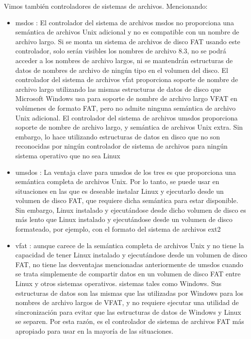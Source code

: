 \documentclass[11pt, a4paper]{report}
\begin{document}
Vimos también controladores de sistemas de archivos. Mencionando: \\

\begin{itemize}
\item msdos : El controlador del sistema de archivos msdos no proporciona una
  semántica de archivos Unix adicional y no es compatible con un nombre de
  archivo largo. Si se monta un sistema de archivos de disco FAT usando este
  controlador, solo serán visibles los nombres de archivo 8.3, no se podrá
  acceder a los nombres de archivo largos, ni se mantendrán estructuras de
  datos de nombres de archivo de ningún tipo en el volumen del disco. El
  controlador del sistema de archivos vfat proporciona soporte de nombre de
  archivo largo utilizando las mismas estructuras de datos de disco que
  Microsoft Windows usa para soporte de nombre de archivo largo VFAT en
  volúmenes de formato FAT, pero no admite ninguna semántica de archivo Unix
  adicional. El controlador del sistema de archivos umsdos proporciona soporte
  de nombre de archivo largo, y semántica de archivos Unix extra. Sin embargo,
  lo hace utilizando estructuras de datos en disco que no son reconocidas por
  ningún controlador de sistema de archivos para ningún sistema operativo que
  no sea Linux
\item umsdos : La ventaja clave para umsdos de los tres es que proporciona una
  semántica completa de archivos Unix. Por lo tanto, se puede usar en
  situaciones en las que es deseable instalar Linux y ejecutarlo desde un
  volumen de disco FAT, que requiere dicha semántica para estar disponible.
  Sin embargo, Linux instalado y ejecutándose desde dicho volumen de disco es
  más lento que Linux instalado y ejecutándose desde un volumen de disco
  formateado, por ejemplo, con el formato del sistema de archivos ext2 
\item vfat : aunque carece de la semántica completa de archivos Unix y no tiene
  la capacidad de tener Linux instalado y ejecutándose desde un volumen de
  disco FAT, no tiene las desventajas mencionadas anteriormente de umsdos
  cuando se trata simplemente de compartir datos en un volumen de disco FAT
  entre Linux y otros sistemas operativos. sistemas tales como Windows. Sus
  estructuras de datos son las mismas que las utilizadas por Windows para los
  nombres de archivo largos de VFAT, y no requiere ejecutar una utilidad de
  sincronización para evitar que las estructuras de datos de Windows y Linux
  se separen. Por esta razón, es el controlador de sistema de archivos FAT más
  apropiado para usar en la mayoría de las situaciones.
\end{itemize}
\end{document}
